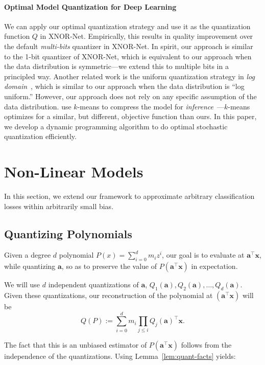 \documentclass{article}
\renewcommand{\vec}[1]{\mathbf{#1}}
\begin{document}
\paragraph*{Optimal Model Quantization for Deep Learning}

We can apply our optimal quantization strategy 
and use it as the quantization function $Q$
in XNOR-Net. Empirically, this results in 
quality improvement
over the default {\em multi-bits} quantizer in XNOR-Net. 
In spirit, our approach is similar to the 1-bit quantizer of
XNOR-Net, which is equivalent to our approach when the data
distribution is symmetric---we extend this
to multiple bits in a principled way. Another related work
is the uniform quantization strategy 
in {\em log domain}~\cite{miyashita2016convolutional},
which is similar to our approach when the data distribution
is ``log uniform.'' However, our approach does not rely on
any specific assumption of the data distribution.
\citet{Han:2016:ICLR} use $k$-means to
compress the model for {\em inference}~---$k$-means
optimizes for a similar, but different, objective
function than ours. In this paper, we 
develop a dynamic
programming algorithm to do optimal stochastic quantization efficiently.



\section{Non-Linear Models}

In this section, we extend our framework to approximate arbitrary classification losses within arbitrarily small bias. 

\subsection{Quantizing Polynomials} 

Given a degree $d$ polynomial $P(x) = \sum_{i = 0}^{d} m_i z^i$,
our goal is to evaluate at $\vec{a}^\top \vec{x}$, while quantizing $\vec{a}$, so as to preserve the value of $P( \vec{a}^\top \vec{x})$ in expectation. 

We will use $d$ independent quantizations of $\vec{a}$, $Q_1(\vec{a}), Q_2(\vec{a}), \ldots, Q_d(\vec{a})$. 
Given these quantizations, our reconstruction of the polynomial at $( \vec{a}^\top \vec{x})$ will be 
$$ Q(P) := \sum_{i = 0}^d m_i \prod_{j \leq i} Q_j(\vec{a})^\top \vec{x}.$$

The fact that this is an unbiased estimator of $P( \vec{a}^\top \vec{x} )$ follows from the independence of the quantizations. Using Lemma~\ref{lem:quant-facts} yields:
\end{document}
